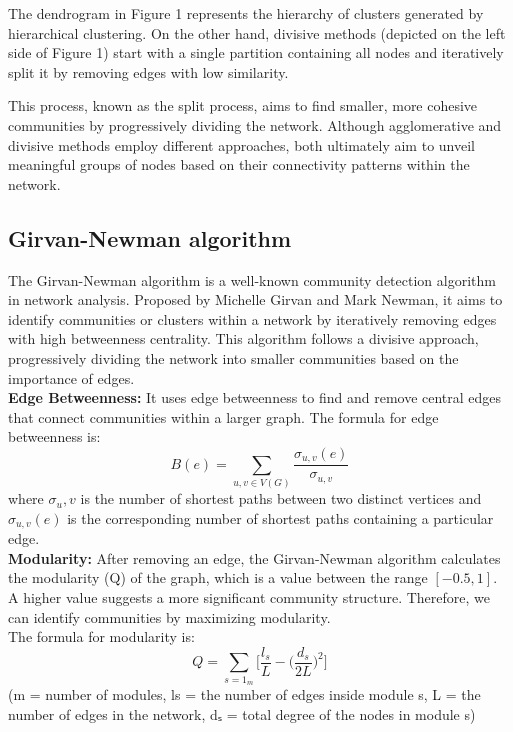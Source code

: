 The dendrogram in Figure 1 represents the hierarchy of clusters generated by hierarchical clustering. On the other hand, divisive methods (depicted on the left side of Figure 1) start with a single partition containing all nodes and iteratively split it by removing edges with low similarity. 

This process, known as the split process, aims to find smaller, more cohesive communities by progressively dividing the network. Although agglomerative and divisive methods employ different approaches, both ultimately aim to unveil meaningful groups of nodes based on their connectivity patterns within the network.
\subsection{Girvan-Newman algorithm}
The Girvan-Newman algorithm is a well-known community detection algorithm in network analysis. Proposed by Michelle Girvan and Mark Newman, it aims to identify communities or clusters within a network by iteratively removing edges with high betweenness centrality. This algorithm follows a divisive approach, progressively dividing the network into smaller communities based on the importance of edges.\\
\textbf{Edge Betweenness: } It uses edge betweenness to find and remove central edges that connect communities within a larger graph.
The formula for edge betweenness is: \newline
\begin{equation}
    B(e) = \sum_{u,v \in V(G)} \frac{\sigma_{u,v}(e)}{\sigma_{u,v}}
\end{equation}
where $\sigma{_u,v}$ is the number of shortest paths between two distinct vertices and $\sigma_{u,v}(e)$ is the corresponding number of shortest paths containing a particular edge.\\
\textbf{Modularity: } After removing an edge, the Girvan-Newman algorithm calculates the modularity (Q) of the graph, which is a value between the range $[-0.5,1]$. A higher value suggests a more significant community structure. Therefore, we can identify communities by maximizing modularity.\\

The formula for modularity is: 
\begin{equation}
    Q = \sum_{s=1}_m\Big[\frac{l_s}{L}-\Big(\frac{d_s}{2L}\Big)^2\Big]
\end{equation}
(m = number of modules, ls = the number of edges inside module s, L = the number of edges in the network, dₛ = total degree of the nodes in module s)\\

